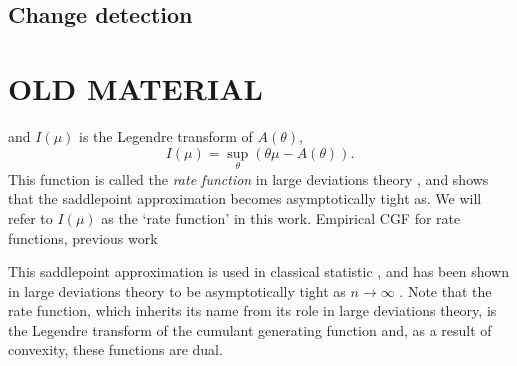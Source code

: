 \documentclass[11pt]{article}      %
\begin{document}
\subsection{Change detection}



\section{OLD MATERIAL}

 and $I(\mu)$ is the Legendre transform of $A(\theta)$,
\begin{equation}
  I(\mu) = \sup_{\theta}( \theta \mu - A(\theta) ).
\end{equation}
This function is called the \textit{rate function} in large deviations theory \cite{dembo2009large}, and shows that the saddlepoint approximation becomes asymptotically tight as.
We will refer to $I(\mu)$ as the `rate function' in this work.
Empirical CGF for rate functions, previous work



This saddlepoint approximation is used in classical statistic \cite{daniels_saddlepoint_1954,barndorff-nielsen_edgeworth_1979,davison_saddlepoint_1988,ronchetti_empirical_1994}, and has been shown in large deviations theory \cite{dembo2009large} to be asymptotically tight as $n \to \infty$ \cite{iltis_sharp_1995,chaganty_multidimensional_1986}.
Note that the rate function, which inherits its name from its role in large deviations theory, is the Legendre transform of the cumulant generating function and, as a result of convexity, these functions are dual.
\end{document}
